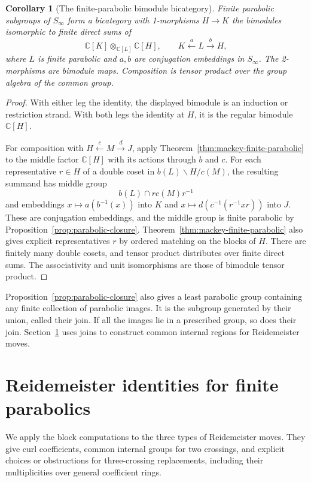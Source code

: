 \documentclass[11pt,a4paper]{article}
\numberwithin{equation}{section}
\newtheorem{corollary}[theorem]{Corollary}
\theoremstyle{definition}
\newcommand{\C}{\mathbb C}
\begin{document}
\begin{corollary}[The finite-parabolic bimodule bicategory]
\label{cor:parabolic-bicategory}
Finite parabolic subgroups of \(S_\infty\) form a bicategory with
1-morphisms \(H\to K\) the bimodules isomorphic to finite direct sums of
\[
 \C[K]\otimes_{\C[L]}\C[H],
 \qquad K\xleftarrow{a}L\xrightarrow{b}H,
\]
where \(L\) is finite parabolic and \(a,b\) are conjugation embeddings
in \(S_\infty\). The 2-morphisms are bimodule maps. Composition is
tensor product over the group algebra of the common group.
\end{corollary}

\begin{proof}
With either leg the identity, the displayed bimodule is an induction
or restriction strand. With both legs the identity at \(H\), it is
the regular bimodule \(\C[H]\).

For composition with \(H\xleftarrow{c}M\xrightarrow{d}J\), apply
Theorem~\ref{thm:mackey-finite-parabolic} to the middle factor
\(\C[H]\) with its actions through \(b\) and \(c\). For each
representative \(r\in H\) of a double coset in \(b(L)\backslash H/c(M)\),
the resulting summand has middle group
\[
 b(L)\cap r c(M)r^{-1}
\]
and embeddings \(x\mapsto a(b^{-1}(x))\) into \(K\) and
\(x\mapsto d(c^{-1}(r^{-1}xr))\) into \(J\). These are conjugation
embeddings, and the middle group is finite parabolic by
Proposition~\ref{prop:parabolic-closure}. Theorem~\ref{thm:mackey-finite-parabolic}
also gives explicit representatives \(r\) by ordered matching on
the blocks of \(H\). There are finitely many double cosets, and tensor
product distributes over finite direct sums. The associativity and
unit isomorphisms are those of bimodule tensor product.
\end{proof}

Proposition~\ref{prop:parabolic-closure} also gives a least parabolic
group containing any finite collection of parabolic images. It is the
subgroup generated by their union, called their join. If all the
images lie in a prescribed group, so does their join.
Section~\ref{sec:parabolic-moves} uses joins to construct common
internal regions for Reidemeister moves.

\section{Reidemeister identities for finite parabolics}\label{sec:parabolic-moves}

We apply the block computations to the three types of Reidemeister
moves. They give curl coefficients, common internal groups for
two crossings, and explicit choices or obstructions for
three-crossing replacements, including their multiplicities over
general coefficient rings.
\end{document}
